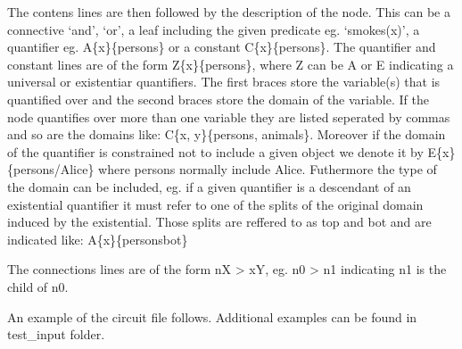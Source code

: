 \documentclass[letterpaper,10pt,english,openany,oneside]{sphinxmanual}
\begin{document}
The contens lines are then followed by the description of the node. This can be a connective ‘and’, ‘or’, a leaf including the given predicate eg. ‘smokes(x)’, a quantifier eg. A\{x\}\{persons\} or a constant C\{x\}\{persons\}. The quantifier and constant lines are of the form Z\{x\}\{persons\}, where Z can be A or E indicating a universal or existentiar quantifiers. The first braces store the variable(s) that is quantified over and the second braces store the domain of the variable. If the node quantifies over more than one variable they are listed seperated by commas and so are the domains like: C\{x, y\}\{persons, animals\}. Moreover if the domain of the quantifier is constrained not to include a given object we denote it by E\{x\}\{persons/Alice\} where persons normally include Alice. Futhermore the type of the domain can be included, eg. if a given quantifier is a descendant of an existential quantifier it must refer to one of the splits of the original domain induced by the existential. Those splits are reffered to as top and bot and are indicated like: A\{x\}\{persons\sphinxhyphen{}bot\}

The connections lines are of the form nX \sphinxhyphen{}\textgreater{} xY, eg. n0 \sphinxhyphen{}\textgreater{} n1 indicating n1 is the child of n0.

An example of the circuit file follows. Additional examples can be found in test\_input folder.
\end{document}
